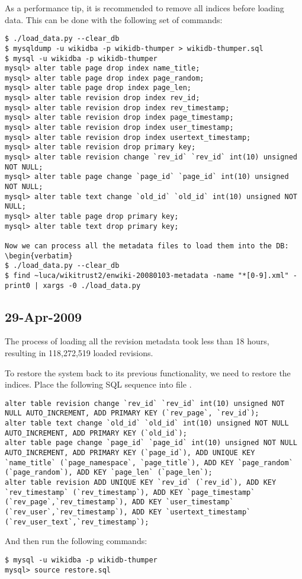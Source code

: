 As a performance tip, it is recommended to remove all indices
before loading data.  This can be done with the following set
of commands:
\begin{verbatim}
$ ./load_data.py --clear_db
$ mysqldump -u wikidba -p wikidb-thumper > wikidb-thumper.sql
$ mysql -u wikidba -p wikidb-thumper
mysql> alter table page drop index name_title;
mysql> alter table page drop index page_random;
mysql> alter table page drop index page_len;
mysql> alter table revision drop index rev_id;
mysql> alter table revision drop index rev_timestamp;
mysql> alter table revision drop index page_timestamp;
mysql> alter table revision drop index user_timestamp;
mysql> alter table revision drop index usertext_timestamp;
mysql> alter table revision drop primary key;
mysql> alter table revision change `rev_id` `rev_id` int(10) unsigned NOT NULL;
mysql> alter table page change `page_id` `page_id` int(10) unsigned NOT NULL;
mysql> alter table text change `old_id` `old_id` int(10) unsigned NOT NULL;
mysql> alter table page drop primary key;
mysql> alter table text drop primary key;

Now we can process all the metadata files to load them into the DB:
\begin{verbatim}
$ ./load_data.py --clear_db
$ find ~luca/wikitrust2/enwiki-20080103-metadata -name "*[0-9].xml" -print0 | xargs -0 ./load_data.py 
\end{verbatim}

\subsection{29-Apr-2009}

The process of loading all the revision metadata took less than 18 hours,
resulting in 118,272,519 loaded revisions.

To restore the system back to its previous functionality, we need to
restore the indices.  Place the following SQL sequence into
file .
%
\begin{verbatim}
alter table revision change `rev_id` `rev_id` int(10) unsigned NOT NULL AUTO_INCREMENT, ADD PRIMARY KEY (`rev_page`, `rev_id`);
alter table text change `old_id` `old_id` int(10) unsigned NOT NULL AUTO_INCREMENT, ADD PRIMARY KEY (`old_id`);
alter table page change `page_id` `page_id` int(10) unsigned NOT NULL AUTO_INCREMENT, ADD PRIMARY KEY (`page_id`), ADD UNIQUE KEY `name_title` (`page_namespace`, `page_title`), ADD KEY `page_random` (`page_random`), ADD KEY `page_len` (`page_len`);
alter table revision ADD UNIQUE KEY `rev_id` (`rev_id`), ADD KEY `rev_timestamp` (`rev_timestamp`), ADD KEY `page_timestamp` (`rev_page`,`rev_timestamp`), ADD KEY `user_timestamp` (`rev_user`,`rev_timestamp`), ADD KEY `usertext_timestamp` (`rev_user_text`,`rev_timestamp`);
\end{verbatim}
%
And then run the following commands:
\begin{verbatim}
$ mysql -u wikidba -p wikidb-thumper
mysql> source restore.sql
\end{verbatim}

